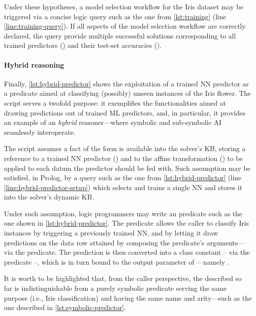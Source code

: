 \documentclass[
]{ceurart}
\begin{document}
Under these hypotheses, a model selection workflow for the Iris dataset may be triggered via a concise logic query such as the one from \cref{lst:training} (line \ref{line:training-query}).
%
If all aspects of the model selection workflow are correctly declared, the query provide multiple successful solutions corresponding to all trained predictors () and their test-set accuracies ().

\paragraph{Hybrid reasoning}

\prologimport[
    float,
    label={lst:hybrid-predictor},
    caption={Exploitation of the NN classifier trained in \cref{lst:training} to create an hybrid predicate} %
]{listings/hybrid-predictor.pl}

Finally, \cref{lst:hybrid-predictor} shows the exploitation of a trained NN predictor as a predicate aimed at classifying (possibly) unseen instances of the Iris flower.
%
The script serves a twofold purpose: it exemplifies the \mllib{} functionalities aimed at drawing predictions out of trained ML predictors, and, in particular, it provides an example of an \emph{hybrid} reasoner---where symbolic and sub-symbolic AI seamlessly interoperate.

The script assumes a fact of the form  is available into the solver's KB, storing a reference to a trained NN predictor () and to the affine transformation () to be applied to each datum the predictor should be fed with.
%
Such assumption may be satisfied, in Prolog, by a query such as the one from \cref{lst:hybrid-predictor} (line \ref{line:hybrid-predictor-setup}) which selects and trains a single NN and stores it into the solver's dynamic KB.

Under such assumption, logic programmers may write an  predicate such as the one shown in \cref{lst:hybrid-predictor}.
%
The predicate allows the caller to classify Iris instances by triggering a previously trained NN, and by letting it draw predictions on the data row attained by composing the predicate's arguments---via the  predicate.
%
The prediction is then converted into a class constant -- via the  predicate --, which is in turn bound to the output parameter of ---namely .

It is worth to be highlighted that, from the caller perspective, the  described so far is indistinguishable from a purely symbolic predicate serving the same purpose (i.e., Iris classification) and having the same name and arity---such as the one described in \cref{lst:symbolic-predictor}.
\end{document}
